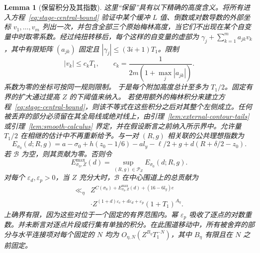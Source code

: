 \documentclass[11pt,a4paper]{article}
\numberwithin{equation}{section}
\numberwithin{figure}{section}
\newtheorem{lemma}[theorem]{Lemma}
\theoremstyle{definition}
\theoremstyle{remark}
\begin{document}
\begin{lemma}[保留积分及其指数]
这里“保留”具有以下精确的高度含义。将所有进入方程~\eqref{eq:stage-central-bound} 验证中某个缓冲 $L$ 值、倒数或对数导数的外部坐标 $v_1,\ldots,v_m$ 列出一次，并包含全部三个原始梅林高度，当它们不出现在某个自变量中时取零系数。经过纯扭转移后，每个这样的自变量的虚部为
$\gamma_j+\sum_{k=1}^m a_{jk}v_k$，其中有限矩阵 $(a_{jk})$ 固定且 $|\gamma_j|\le(3i+1)T_1$。限制
\begin{equation}
 |v_k|\le c_kT_1,\qquad
 c_k=\frac1{2m(1+\max_j|a_{jk}|)}.
 \label{eq:stage-height-allocation}
\end{equation}
系数为零的坐标可按同一规则限制。
于是每个附加高度总计至多为 $T_1/2$。固定有界的扩大通过提高 $Z$ 的下阈值来纳入。
若使用额外的梅林积分来建立方程~\eqref{eq:stage-central-bound}，则该不等式在这些积分之后对其整个左侧成立。任何被丢弃的部分必须留在其全局线或绝对线上，由引理~\ref{lem:external-contour-tails} 或引理~\ref{lem:smooth-calculus} 界定，并在假设断言之前纳入所示界中。允许量 $T_1/2$ 在相继的估计中不再重新给予。与一对 $(R,g)$ 相关联的公共理想指数为
\begin{equation}
 E_{\sigma_0}(d;R,g)=a-\sigma_0+h(z_0-1/6)-a l_y-\ell/2+g
                  +d(R+\delta/2-z_0).
 \label{eq:stage-high-exponent}
\end{equation}
若 $\mathcal B$ 为空，则其贡献为零。否则令
\[
 E^{\max}_{\sigma_0,Z}(d)
   =\sup_{(R,g)\in\mathcal P_Z}E_{\sigma_0}(d;R,g).
\]
对每个 $\varepsilon_d,\varepsilon_p>0$，当 $Z$ 充分大时，$\mathcal B$ 在中心围道上的总贡献为
\begin{equation}
 \begin{split}
 \ll_\eta{}& Z^{C(\sigma_0)+E^{\max}_{\sigma_0,Z}(d)+(16-6l_y)e}\\
 &\cdot Z^{(1+d)\varepsilon_c+d\varepsilon_d+\varepsilon_p}
       (1+T_1)^{A_\eta}.
 \end{split}
 \label{eq:stage-central-contribution}
\end{equation}
上确界有限，因为这些对位于一个固定的有界范围内。幂 $\varepsilon_p$ 吸收了逐点的对数重数。并未断言对逐点片段或行集有单独的积分。在此围道移动中，所有被舍弃的部分与水平连接项对每个固定的 $N$ 均为 $O_{\eta,N}(Z^{B_\eta}T_1^{-N})$，其中 $B_\eta$ 有限且在 $N$ 之前固定。
\end{lemma}
\end{document}
